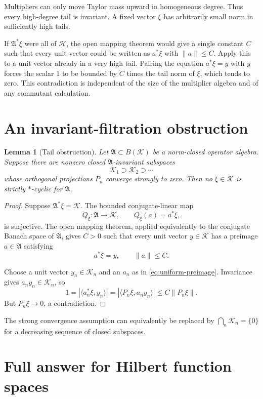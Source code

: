 \documentclass[11pt]{article}
\newtheorem{lemma}[theorem]{Lemma}
\newcommand{\Hh}{\mathcal H}
\newcommand{\Kk}{\mathcal K}
\begin{document}
Multipliers can only move Taylor mass upward in homogeneous degree.  Thus
every high-degree tail is invariant.  A fixed vector $\xi$ has arbitrarily
small norm in sufficiently high tails.

If $\mathfrak A^*\xi$ were all of $\Hh$, the open mapping theorem would give
a single constant $C$ such that every unit vector could be written as
$a^*\xi$ with $\|a\|\leq C$.  Apply this to a unit vector already in a very
high tail.  Pairing the equation $a^*\xi=y$ with $y$ forces the scalar $1$
to be bounded by $C$ times the tail norm of $\xi$, which tends to zero.  This
contradiction is independent of the size of the multiplier algebra and of
any commutant calculation.

\section{An invariant-filtration obstruction}

\begin{lemma}[Tail obstruction]\label{lem:tail}
Let $\mathfrak A\subset B(\Kk)$ be a norm-closed operator algebra.  Suppose
there are nonzero closed $\mathfrak A$-invariant subspaces
\[
 \Kk_1\supset\Kk_2\supset\cdots
\]
whose orthogonal projections $P_n$ converge strongly to zero.  Then no
$\xi\in\Kk$ is strictly $*$-cyclic for $\mathfrak A$.
\end{lemma}

\begin{proof}
Suppose $\mathfrak A^*\xi=\Kk$.  The bounded conjugate-linear map
\[
 Q_\xi:\mathfrak A\longrightarrow\Kk,
 \qquad Q_\xi(a)=a^*\xi,
\]
is surjective.  The open mapping theorem, applied equivalently to the
conjugate Banach space of $\mathfrak A$, gives $C>0$ such that every unit
vector $y\in\Kk$ has a preimage $a\in\mathfrak A$ satisfying
\begin{equation}\label{eq:uniform-preimage}
 a^*\xi=y,\qquad \|a\|\leq C.
\end{equation}

Choose a unit vector $y_n\in\Kk_n$ and an $a_n$ as in
\eqref{eq:uniform-preimage}.  Invariance gives $a_ny_n\in\Kk_n$, so
\[
 1=|\langle a_n^*\xi,y_n\rangle|
  =|\langle P_n\xi,a_ny_n\rangle|
  \leq C\|P_n\xi\|.
\]
But $P_n\xi\to0$, a contradiction.
\end{proof}

The strong convergence assumption can equivalently be replaced by
$\bigcap_n\Kk_n=\{0\}$ for a decreasing sequence of closed subspaces.

\section{Full answer for Hilbert function spaces}
\end{document}
